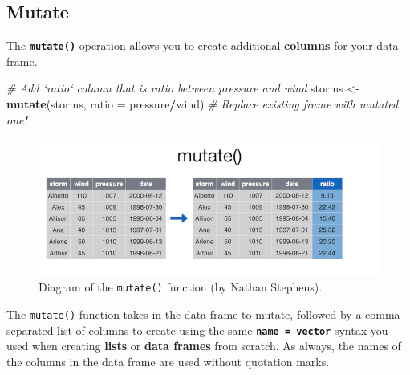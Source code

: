\documentclass[]{book}
\newenvironment{Shaded}{\begin{snugshade}}{\end{snugshade}}
\newcommand{\KeywordTok}[1]{\textcolor[rgb]{0.13,0.29,0.53}{\textbf{#1}}}
\newcommand{\DataTypeTok}[1]{\textcolor[rgb]{0.13,0.29,0.53}{#1}}
\newcommand{\DecValTok}[1]{\textcolor[rgb]{0.00,0.00,0.81}{#1}}
\newcommand{\StringTok}[1]{\textcolor[rgb]{0.31,0.60,0.02}{#1}}
\newcommand{\CommentTok}[1]{\textcolor[rgb]{0.56,0.35,0.01}{\textit{#1}}}
\newcommand{\OperatorTok}[1]{\textcolor[rgb]{0.81,0.36,0.00}{\textbf{#1}}}
\newcommand{\NormalTok}[1]{#1}
\theoremstyle{definition}
\theoremstyle{definition}
\theoremstyle{remark}
\begin{document}
\begin{Shaded}
\end{Shaded}

\subsection{Mutate}\label{mutate}

The \textbf{\texttt{mutate()}} operation allows you to create additional
\textbf{columns} for your data frame.

\begin{Shaded}
\begin{Highlighting}[]
\CommentTok{# Add `ratio` column that is ratio between pressure and wind}
\NormalTok{storms <-}\StringTok{ }\KeywordTok{mutate}\NormalTok{(storms, }\DataTypeTok{ratio =}\NormalTok{ pressure}\OperatorTok{/}\NormalTok{wind)  }\CommentTok{# Replace existing frame with mutated one!}
\end{Highlighting}
\end{Shaded}

\begin{figure}
\centering
\includegraphics{img/dplyr/mutate.png}
\caption{Diagram of the \texttt{mutate()} function (by Nathan
Stephens).}
\end{figure}

The \texttt{mutate()} function takes in the data frame to mutate,
followed by a comma-separated list of columns to create using the same
\textbf{\texttt{name\ =\ vector}} syntax you used when creating
\textbf{lists} or \textbf{data frames} from scratch. As always, the
names of the columns in the data frame are used without quotation marks.
\end{document}
